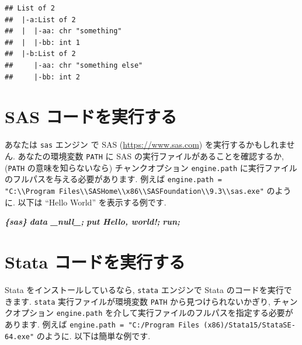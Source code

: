 \documentclass[
  11pt,
  lualatex,ja=standard,jafont=noto]{bxjsreport}
\newenvironment{Shaded}{\begin{snugshade}}{\end{snugshade}}
\newcommand{\InformationTok}[1]{\textcolor[rgb]{0.56,0.35,0.01}{\textbf{\textit{#1}}}}
\begin{document}
\begin{verbatim}
## List of 2
##  |-a:List of 2
##  |  |-aa: chr "something"
##  |  |-bb: int 1
##  |-b:List of 2
##     |-aa: chr "something else"
##     |-bb: int 2
\end{verbatim}

\hypertarget{eng-sas}{%
\section{SAS コードを実行する}\label{eng-sas}}

あなたは \texttt{sas} エンジン で SAS (\url{https://www.sas.com}) を実行するかもしれません. あなたの環境変数 \texttt{PATH} に SAS の実行ファイルがあることを確認するか, (\texttt{PATH} の意味を知らないなら) チャンクオプション \texttt{engine.path} に実行ファイルのフルパスを与える必要があります. 例えば \texttt{engine.path = "C:\textbackslash{}\textbackslash{}Program\ Files\textbackslash{}\textbackslash{}SASHome\textbackslash{}\textbackslash{}x86\textbackslash{}\textbackslash{}SASFoundation\textbackslash{}\textbackslash{}9.3\textbackslash{}\textbackslash{}sas.exe"} のように. 以下は ``Hello World'' を表示する例です.

\begin{Shaded}
\begin{Highlighting}[]
\InformationTok{\textasciigrave{}\textasciigrave{}\textasciigrave{}\{sas\}}
\InformationTok{data \_null\_;}
\InformationTok{put \textquotesingle{}Hello, world!\textquotesingle{};}
\InformationTok{run;}
\InformationTok{\textasciigrave{}\textasciigrave{}\textasciigrave{}}
\end{Highlighting}
\end{Shaded}

\hypertarget{eng-stata}{%
\section{Stata コードを実行する}\label{eng-stata}}

Stata をインストールしているなら, \texttt{stata} エンジンで Stata のコードを実行できます. \texttt{stata} 実行ファイルが環境変数 \texttt{PATH} から見つけられないかぎり, チャンクオプション \texttt{engine.path} を介して実行ファイルのフルパスを指定する必要があります. 例えば \texttt{engine.path = "C:/Program Files (x86)/Stata15/StataSE-64.exe"} のように. 以下は簡単な例です.
\end{document}
